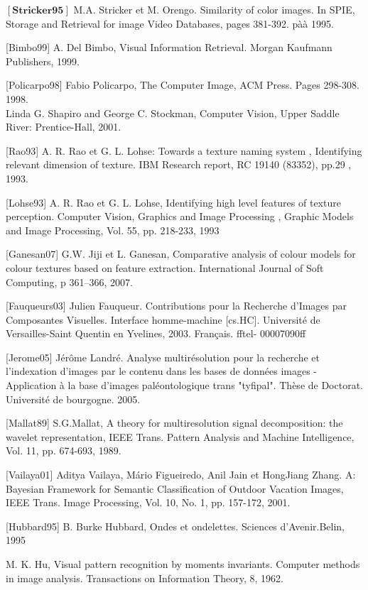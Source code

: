 $\left[\textbf{Stricker95}\right]$ M.A. Stricker et M. Orengo. Similarity of color images. In SPIE, Storage
and Retrieval for image Video Databases, pages 381-392. pàà 1995.

[Bimbo99] A. Del Bimbo, Visual Information Retrieval. Morgan Kaufmann Publishers, 1999.

[Policarpo98] Fabio Policarpo, The Computer Image, ACM Press. Pages 298-308. 1998.
\\
[Linda01] Linda G. Shapiro and George C. Stockman, Computer Vision, Upper Saddle River:
Prentice-Hall, 2001.

[Rao93] A. R. Rao et G. L. Lohse: Towards a texture naming system , Identifying relevant
dimension of texture. IBM Research report, RC 19140 (83352), pp.29 , 1993.

[Lohse93] A. R. Rao et G. L. Lohse, Identifying high level features of texture perception.
Computer Vision, Graphics and Image Processing , Graphic Models and Image Processing,
Vol. 55, pp. 218-233, 1993

[Ganesan07] G.W. Jiji et L. Ganesan, Comparative analysis of colour models for colour textures
based on feature extraction. International Journal of Soft Computing, p 361–366, 2007.

[Fauqueurs03] Julien Fauqueur. Contributions pour la Recherche d’Images par Composantes Visuelles. Interface
homme-machine [cs.HC]. Université de Versailles-Saint Quentin en Yvelines, 2003. Français. ﬀtel-
00007090ﬀ

[Jerome05] Jérôme Landré. Analyse multirésolution pour la recherche et
l’indexation d’images par le contenu dans les bases de données images -
Application à la base d’images paléontologique trans "tyfipal". Thèse de
Doctorat. Université de bourgogne. 2005.

[Mallat89] S.G.Mallat, A theory for multiresolution signal decomposition: the wavelet
representation, IEEE Trans. Pattern Analysis and Machine Intelligence, Vol. 11, pp. 674-693,
1989.

[Vailaya01] Aditya Vailaya, Mário Figueiredo, Anil Jain et HongJiang Zhang. A: Bayesian
Framework for Semantic Classification of Outdoor Vacation Images, IEEE Trans. Image
Processing, Vol. 10, No. 1, pp. 157-172, 2001.

[Hubbard95] B. Burke Hubbard, Ondes et ondelettes. Sciences d'Avenir.Belin, 1995

M. K. Hu, Visual pattern recognition by moments invariants. Computer methods in
image analysis. Transactions on Information Theory, 8, 1962.

